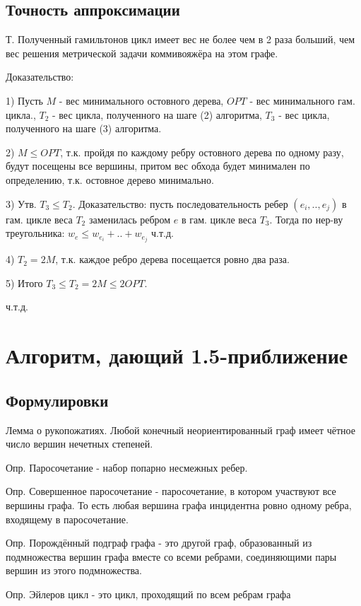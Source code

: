 \documentclass[a4paper,12pt]{article}
\begin{document}
\subsection{Точность аппроксимации}

Т. Полученный гамильтонов цикл имеет вес не более чем в 2 раза больший, чем вес решения метрической задачи коммивояжёра на этом графе.

Доказательство:

1) Пусть $M$ - вес минимального остовного дерева, $OPT$ - вес минимального гам. цикла., $T_2$ - вес цикла, полученного на шаге (2) алгоритма, $T_3$ - вес цикла, полученного на шаге (3) алгоритма.

2) $ M \leq OPT$, т.к. пройдя по каждому ребру остовного дерева по одному разу, будут посещены все вершины, притом вес обхода будет минимален по определению, т.к. остовное дерево минимально.

3) Утв. $T_3 \leq T_2$. Доказательство: пусть последовательность ребер $(e_i, .., e_j)$ в гам. цикле веса $T_2$ заменилась ребром $e$ в гам. цикле веса $T_3$. Тогда по нер-ву треугольника: $w_e \leq w_{e_i} + .. + w_{e_j}$ ч.т.д.

4) $T_2 = 2M$, т.к. каждое ребро дерева посещается ровно два раза.

5) Итого $T_3 \leq T_2 = 2M \leq 2OPT$.

ч.т.д.

\section{Алгоритм, дающий 1.5-приближение}

\subsection{Формулировки}

Лемма о рукопожатиях. Любой конечный неориентированный граф имеет чётное число вершин нечетных степеней.

Опр. Паросочетание - набор попарно несмежных ребер.

Опр. Совершенное паросочетание - паросочетание, в котором участвуют все вершины графа. То есть любая вершина графа инцидентна ровно одному ребра, входящему в паросочетание.

Опр. Порождённый подграф графа - это другой граф, образованный из подмножества вершин графа вместе со всеми ребрами, соединяющими пары вершин из этого подмножества.

Опр. Эйлеров цикл - это цикл, проходящий по всем ребрам графа 
\end{document}
